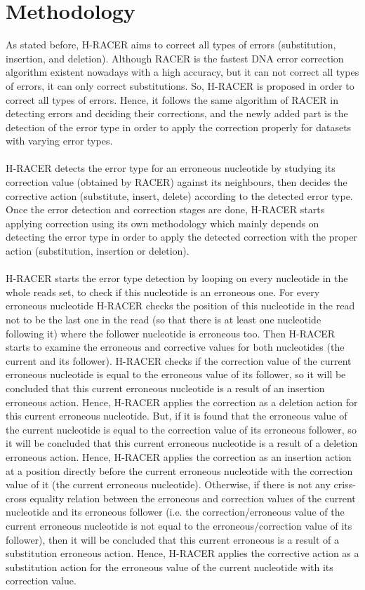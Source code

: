 \documentclass[12pt,openany]{llncs}
\begin{document}
\section{Methodology}
As stated before, H-RACER aims to correct all types of errors (substitution, insertion, and deletion). Although RACER is the fastest DNA error correction algorithm existent nowadays with a high accuracy, but it can not correct all types of errors, it can only correct substitutions. So, H-RACER is proposed in order to correct all types of errors. Hence, it follows the same algorithm of RACER in detecting errors and deciding their corrections, and the newly added part is the detection of the error type in order to apply the correction properly for datasets with varying error types.
\\
\\
H-RACER detects the error type for an erroneous nucleotide by studying its correction value (obtained by RACER) against its neighbours, then decides the corrective action (substitute, insert, delete) according to the detected error type.
Once the error detection and correction stages are done, H-RACER starts applying correction using its own methodology which mainly depends on detecting the error type in order to apply the detected correction with the proper action (substitution, insertion or deletion).
\\
\\
H-RACER starts the error type detection by looping on every nucleotide in the whole reads set, to check if this nucleotide is an erroneous one. For every erroneous nucleotide H-RACER checks the position of this nucleotide in the read not to be the last one in the read (so that there is at least one nucleotide following it) where the follower nucleotide is erroneous too. Then H-RACER starts to examine the erroneous and corrective values for both nucleotides (the current and its follower). H-RACER checks if the correction value of the current erroneous nucleotide is equal to the erroneous value of its follower, so it will be concluded that this current erroneous nucleotide is a result of an insertion erroneous action. Hence, H-RACER applies the correction as a deletion action for this current erroneous nucleotide. But, if it is found that the erroneous value of the current nucleotide is equal to the correction value of its erroneous follower, so it will be concluded that this current erroneous nucleotide is a result of a deletion erroneous action. Hence, H-RACER applies the correction as an insertion action at a position directly before the current erroneous nucleotide with the correction value of it (the current erroneous nucleotide). Otherwise, if there is not any criss-cross equality relation between the erroneous and correction values of the current nucleotide and its erroneous follower (i.e. the correction/erroneous value of the current erroneous nucleotide is not equal to the erroneous/correction value of its follower), then it will be concluded that this current erroneous is a result of a substitution erroneous action. Hence, H-RACER applies the corrective action as a substitution action for the erroneous value of the current nucleotide with its correction value.
\end{document}
